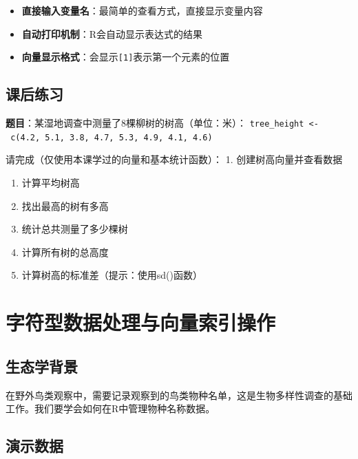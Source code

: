 \documentclass[
]{book}
\providecommand{\tightlist}{%
  \setlength{\itemsep}{0pt}\setlength{\parskip}{0pt}}
\begin{document}
\begin{itemize}
\tightlist
\item
  \textbf{直接输入变量名}：最简单的查看方式，直接显示变量内容
\item
  \textbf{自动打印机制}：R会自动显示表达式的结果
\item
  \textbf{向量显示格式}：会显示\texttt{{[}1{]}}表示第一个元素的位置
\end{itemize}

\hypertarget{ux8bfeux540eux7ec3ux4e60}{%
\subsection{课后练习}\label{ux8bfeux540eux7ec3ux4e60}}

\textbf{题目}：某湿地调查中测量了8棵柳树的树高（单位：米）：
\texttt{tree\_height\ \textless{}-\ c(4.2,\ 5.1,\ 3.8,\ 4.7,\ 5.3,\ 4.9,\ 4.1,\ 4.6)}

请完成（仅使用本课学过的向量和基本统计函数）：
1. 创建树高向量并查看数据

\begin{enumerate}
\def\labelenumi{\arabic{enumi}.}
\setcounter{enumi}{1}
\item
  计算平均树高
\item
  找出最高的树有多高
\item
  统计总共测量了多少棵树
\item
  计算所有树的总高度
\item
  计算树高的标准差（提示：使用sd()函数）
\end{enumerate}

\hypertarget{ux5b57ux7b26ux578bux6570ux636eux5904ux7406ux4e0eux5411ux91cfux7d22ux5f15ux64cdux4f5c}{%
\section{字符型数据处理与向量索引操作}\label{ux5b57ux7b26ux578bux6570ux636eux5904ux7406ux4e0eux5411ux91cfux7d22ux5f15ux64cdux4f5c}}

\hypertarget{ux751fux6001ux5b66ux80ccux666f-1}{%
\subsection{生态学背景}\label{ux751fux6001ux5b66ux80ccux666f-1}}

在野外鸟类观察中，需要记录观察到的鸟类物种名单，这是生物多样性调查的基础工作。我们要学会如何在R中管理物种名称数据。

\hypertarget{ux6f14ux793aux6570ux636e-1}{%
\subsection{演示数据}\label{ux6f14ux793aux6570ux636e-1}}
\end{document}
